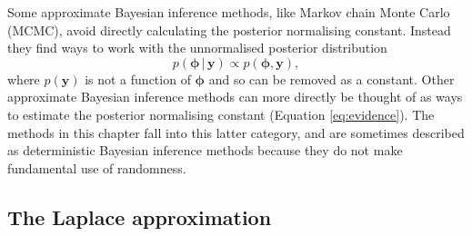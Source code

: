 \documentclass[a4paper, nobind]{templates/ociamthesis}
\begin{document}
Some approximate Bayesian inference methods, like Markov chain Monte Carlo (MCMC), avoid directly calculating the posterior normalising constant.
Instead they find ways to work with the unnormalised posterior distribution
\begin{equation}
p(\boldsymbol{\mathbf{\phi}} \, | \, \mathbf{y}) \propto p(\boldsymbol{\mathbf{\phi}}, \mathbf{y}),
\end{equation}
where \(p(\mathbf{y})\) is not a function of \(\boldsymbol{\mathbf{\phi}}\) and so can be removed as a constant.
Other approximate Bayesian inference methods can more directly be thought of as ways to estimate the posterior normalising constant (Equation \eqref{eq:evidence}).
The methods in this chapter fall into this latter category, and are sometimes described as deterministic Bayesian inference methods because they do not make fundamental use of randomness.

\hypertarget{la}{%
\subsection{The Laplace approximation}\label{la}}
\end{document}
